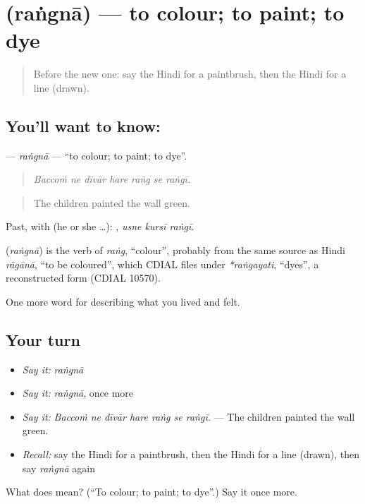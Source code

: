 \section[\texorpdfstring{\hi{रंगना} (raṅgnā)}{रंगना (raṅgnā)}]{ (raṅgnā) — to colour; to paint; to dye}

\label{lesson:HI-C527-rangna}



\begin{quote}
Before the new one: say the Hindi for a paintbrush, then the Hindi for a line (drawn).
\end{quote}

\subsection*{You'll want to know: }
\textbf{} — \emph{raṅgnā} — \textquotedblleft{}to colour; to paint; to dye\textquotedblright{}.

\begin{quote}
      
\end{quote}

\begin{quote}
\emph{Baccoṁ ne dīvār hare raṅg se raṅgī.}
\end{quote}

\begin{quote}
The children painted the wall green.
\end{quote}

Past, with  (he or she …):   , \emph{usne kursī raṅgī}.

\begin{cousinweb}
\textbf{} (\emph{raṅgnā}) is the verb of \emph{raṅg}, \textquotedblleft{}colour\textquotedblright{}, probably from the same source as Hindi \emph{rãgānā}, \textquotedblleft{}to be coloured\textquotedblright{}, which CDIAL files under \emph{*raṅgayati}, \textquotedblleft{}dyes\textquotedblright{}, a reconstructed form (CDIAL 10570).
\end{cousinweb}

\begin{grammarlens}[title={What you've built}]
One more word for describing what you lived and felt.
\end{grammarlens}

\subsection*{Your turn}
\begin{itemize}
\raggedright
  \item \emph{Say it:} \emph{raṅgnā}
  \item \emph{Say it:} \emph{raṅgnā}, once more
  \item \emph{Say it:} \emph{Baccoṁ ne dīvār hare raṅg se raṅgī.} — The children painted the wall green.
  \item \emph{Recall:} say the Hindi for a paintbrush, then the Hindi for a line (drawn), then say \emph{raṅgnā} again
\end{itemize}

\begin{tcolorbox}[breakable,colback=teal!4,colframe=teal!35!black,title={Before you move on}]
What does  mean? (\textquotedblleft{}To colour; to paint; to dye\textquotedblright{}.) Say it once more.
\end{tcolorbox}
